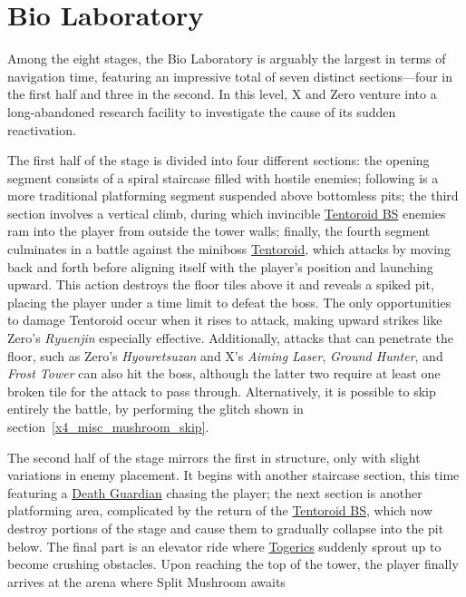 \section{Bio Laboratory}
Among the eight stages, the Bio Laboratory is arguably the largest in terms of navigation time, featuring an impressive total of seven distinct sections—four in the first half and three in the second. In this level, X and Zero venture into a long-abandoned research facility to investigate the cause of its sudden reactivation.

The first half of the stage is divided into four different sections: the opening segment consists of a spiral staircase filled with hostile enemies; following is a more traditional platforming segment suspended above bottomless pits; the third section involves a vertical climb, during which invincible \hyperlink{enem:Tentoroid_BS}{Tentoroid BS} enemies ram into the player from outside the tower walls; finally, the fourth segment culminates in a battle against the miniboss \hyperlink{miniboss:Tentoroid}{Tentoroid}, which attacks by moving back and forth before aligning itself with the player's position and launching upward. This action destroys the floor tiles above it and reveals a spiked pit, placing the player under a time limit to defeat the boss. The only opportunities to damage Tentoroid occur when it rises to attack, making upward strikes like Zero's \emph{Ryuenjin} especially effective. Additionally, attacks that can penetrate the floor, such as Zero’s \emph{Hyouretsuzan} and X’s \emph{Aiming Laser}, \emph{Ground Hunter}, and \emph{Frost Tower} can also hit the boss, although the latter two require at least one broken tile for the attack to pass through. Alternatively, it is possible to skip entirely the battle, by performing the glitch shown in section~\ref{x4_misc_mushroom_skip}.

The second half of the stage mirrors the first in structure, only with slight variations in enemy placement. It begins with another staircase section, this time featuring a \hyperlink{enem:Death_Guardian}{Death Guardian} chasing the player; the next section is another platforming area, complicated by the return of the \hyperlink{enem:Tentoroid_BS}{Tentoroid BS}, which now destroy portions of the stage and cause them to gradually collapse into the pit below. The final part is an elevator ride where \hyperlink{enem:Togerics}{Togerics} suddenly sprout up to become crushing obstacles. Upon reaching the top of the tower, the player finally arrives at the arena where Split Mushroom awaits

